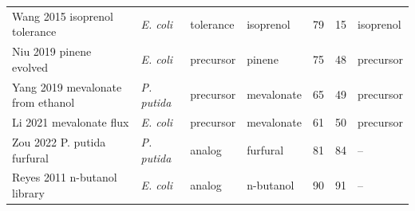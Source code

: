 \begin{longtable}{@{}L{40mm} L{13mm} L{17mm} L{32mm} r r L{20mm}@{}}
Wang 2015 isoprenol tolerance & \emph{E. coli} & tolerance & isoprenol & 79 & 15 & isoprenol \\
Niu 2019 pinene evolved & \emph{E. coli} & precursor & pinene & 75 & 48 & precursor \\
Yang 2019 mevalonate from ethanol & \emph{P. putida} & precursor & mevalonate & 65 & 49 & precursor \\
Li 2021 mevalonate flux & \emph{E. coli} & precursor & mevalonate & 61 & 50 & precursor \\
Zou 2022 P. putida furfural & \emph{P. putida} & analog & furfural & 81 & 84 & -- \\
Reyes 2011 n-butanol library & \emph{E. coli} & analog & n-butanol & 90 & 91 & -- \\
\end{longtable}
\endgroup
